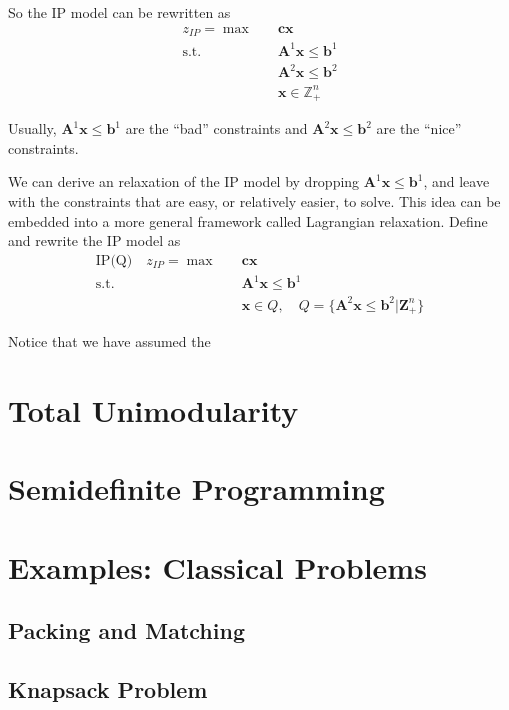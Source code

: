				So the IP model can be rewritten as
				\begin{align*}
					z_{IP} = \max \quad & \mathbf{cx}\\
							\text{s.t.} \quad & \mathbf{A}^1 \mathbf{x} \le \mathbf{b}^1\\
											  & \mathbf{A}^2 \mathbf{x} \le \mathbf{b}^2\\
							&\mathbf{x} \in \mathbb{Z}_+^n
				\end{align*}

				Usually, $\mathbf{A}^1 \mathbf{x} \le \mathbf{b}^1$ are the ``bad'' constraints and $\mathbf{A}^2 \mathbf{x} \le \mathbf{b}^2$ are the ``nice'' constraints.

				We can derive an relaxation of the IP model by dropping $\mathbf{A}^1 \mathbf{x} \le \mathbf{b}^1$, and leave with the constraints that are easy, or relatively easier, to solve. This idea can be embedded into a more general framework called Lagrangian relaxation. Define and rewrite the IP model as
				\begin{align*}
					\text{IP(Q)} \quad z_{IP} = \max \quad & \mathbf{cx}\\
												\text{s.t.} \quad & \mathbf{A}^1 \mathbf{x} \le \mathbf{b}^1 \\
												& \mathbf{x} \in Q, \quad  Q = \{\mathbf{A}^2 \mathbf{x} \le \mathbf{b}^2 | \mathbf{Z}_+^n\}
				\end{align*}

				Notice that we have assumed the 

		\chapter{Total Unimodularity}

		\chapter{Semidefinite Programming}

		\chapter{Examples: Classical Problems}
			\section{Packing and Matching}

			\section{Knapsack Problem}

